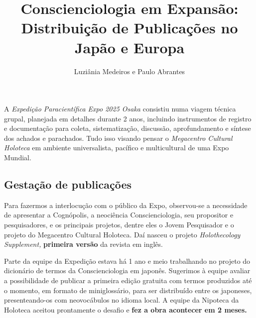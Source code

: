 \documentclass{gescons}
\author{Luziânia Medeiros e Paulo Abrantes}
\title{Conscienciologia em Expansão: Distribuição de Publicações no Japão e Europa}
\begin{document}
    \makeentrevistatitle


    




A \emph{Expedição Paracientífica Expo 2025 Osaka} consistiu numa viagem técnica grupal, planejada em detalhes durante 2 anos, incluindo instrumentos de registro e documentação para coleta, sistematização, discussão, aprofundamento e síntese dos achados e parachados. Tudo isso visando pensar o \emph{Megacentro Cultural Holoteca} em ambiente universalista, pacífico e multicultural de uma Expo Mundial.

\subsection*{Gestação de publicações}

Para fazermos a interlocução com o público da Expo, observou-se a necessidade de apresentar a Cognópolis, a neociência Conscienciologia, seu propositor e pesquisadores, e os principais projetos, dentre eles o Jovem Pesquisador e o projeto do Megacentro Cultural Holoteca. Daí nasceu o projeto \emph{Holothecology Supplement,} \textbf{primeira versão} da revista em inglês.

Parte da equipe da Expedição estava há 1 ano e meio trabalhando no projeto do dicionário de termos da Conscienciologia em japonês. Sugerimos à equipe avaliar a possibilidade de publicar a primeira edição gratuita com termos produzidos até o momento, em formato de miniglossário, para ser distribuído entre os japoneses, presenteando-os com neovocábulos no idioma local. A equipe da Nipoteca da Holoteca aceitou prontamente o desafio e \textbf{fez a obra acontecer em 2 meses.}
\end{document}
